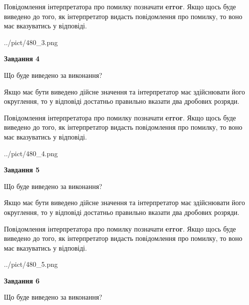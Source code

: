 \documentclass[12pt, ukrainian]{article}
\begin{document}
{\begin {Large}
Повідомлення інтерпретатора про помилку позначати \textbf{error}.
Якщо щось буде виведено до того, як інтерпретатор видасть повідомлення про помилку, 
то воно має вказуватись у відповіді. \par

\begin{center}
	{../pict/480_3.png}
\end{center}
\newpage

{\begin {center}\textbf{Завдання 4}\end {center}}\par
Що буде виведено за виконання? \par

Якщо має бути виведено дійсне значення та інтерпретатор має здійснювати його округлення, 
то у відповіді достатньо правильно вказати два дробових розряди.

Повідомлення інтерпретатора про помилку позначати \textbf{error}.
Якщо щось буде виведено до того, як інтерпретатор видасть повідомлення про помилку, 
то воно має вказуватись у відповіді. \par

\begin{center}
	{../pict/480_4.png}
\end{center}
\newpage

{\begin {center}\textbf{Завдання 5}\end {center}}\par
Що буде виведено за виконання? \par

Якщо має бути виведено дійсне значення та інтерпретатор має здійснювати його округлення, 
то у відповіді достатньо правильно вказати два дробових розряди.

Повідомлення інтерпретатора про помилку позначати \textbf{error}.
Якщо щось буде виведено до того, як інтерпретатор видасть повідомлення про помилку, 
то воно має вказуватись у відповіді. \par

\begin{center}
	{../pict/480_5.png}
\end{center}
\newpage

{\begin {center}\textbf{Завдання 6}\end {center}}\par
Що буде виведено за виконання? \par


\end{Large}}
\end{document}
